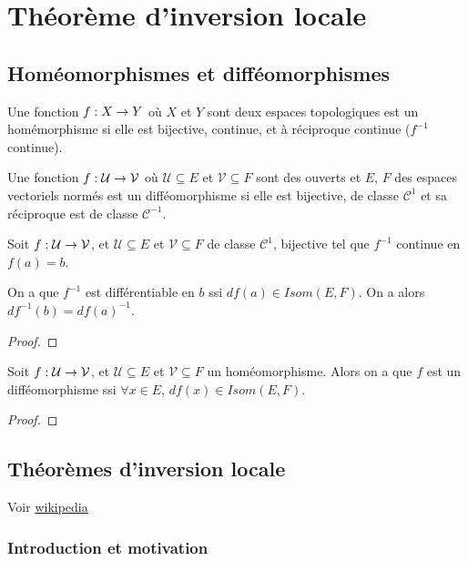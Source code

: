 \chapter{Théorème d'inversion locale}

\section{Homéomorphismes et difféomorphismes}

\begin{definition}
\label{definition_homeomorphisme}
	Une fonction $f : X \rightarrow Y$ où $X$ et $Y$ sont deux espaces
	topologiques est un homémorphisme si elle est bijective, continue, et à
	réciproque continue ($f^{-1}$ continue).
\end{definition}

\begin{definition}
\label{definition_diffeomorphism}
Une fonction $f : \mathcal{U} \rightarrow \mathcal{V}$ où $\mathcal{U}
\subseteq E$ et $\mathcal{V} \subseteq F$ sont des ouverts et $E$, $F$ des espaces
	vectoriels normés est un difféomorphisme si elle est bijective,
	de classe $\mathcal{C}^{1}$ et sa réciproque est de classe
	$\mathcal{C}^{-1}$.
\end{definition}

\begin{proposition}
	Soit $f : \mathcal{U} \rightarrow \mathcal{V}$, et $\mathcal{U} \subseteq
	E$ et $\mathcal{V} \subseteq F$ de classe $\mathcal{C}^{1}$, bijective tel
	que $f^{-1}$ continue en $f(a) = b$.

	On a que $f^{-1}$ est différentiable en $b$ ssi $df(a) \in Isom(E, F)$. On a
	alors $df^{-1}(b) = {df(a)}^{-1}$.
\end{proposition}

\ifdefined\outputproof
\begin{proof}

\end{proof}
\fi

\begin{proposition}
	Soit $f : \mathcal{U} \rightarrow \mathcal{V}$, et $ \mathcal{U} \subseteq
	E$ et $\mathcal{V} \subseteq F$ un homéomorphisme. Alors on a que $f$ est un
	difféomorphisme ssi $\forall x \in E$, $df(x) \in Isom(E, F)$.
\end{proposition}

\ifdefined\outputproof
\begin{proof}

\end{proof}
\fi

\section{Théorèmes d'inversion locale}
	Voir
	\href{http://fr.wikipedia.org/wiki/Th%C3%A9or%C3%A8me_d%27inversion_locale}{wikipedia}
\subsection{Introduction et motivation}
